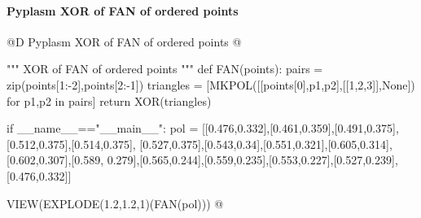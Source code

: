 \documentclass[11pt,oneside]{article}    %
\begin{document}
\paragraph{Pyplasm XOR of FAN of ordered points}

@D Pyplasm XOR of FAN of ordered points
@{""" XOR of FAN of ordered points """ 
def FAN(points): 
	pairs = zip(points[1:-2],points[2:-1])
	triangles = [MKPOL([[points[0],p1,p2],[[1,2,3]],None]) for p1,p2 in pairs]
	return XOR(triangles)
 
if __name__=="__main__":
    pol = [[0.476,0.332],[0.461,0.359],[0.491,0.375],[0.512,0.375],[0.514,0.375],
    [0.527,0.375],[0.543,0.34],[0.551,0.321],[0.605,0.314],[0.602,0.307],[0.589,
    0.279],[0.565,0.244],[0.559,0.235],[0.553,0.227],[0.527,0.239],[0.476,0.332]]

    VIEW(EXPLODE(1.2,1.2,1)(FAN(pol)))
@}




\end{document}

